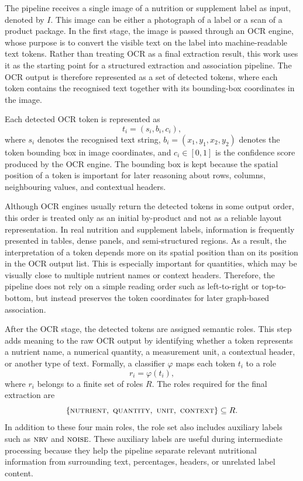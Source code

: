 The pipeline receives a single image of a nutrition or supplement label as input, denoted by \(I\). This image can be either a photograph of a label or a scan of a product package. In the first stage, the image is passed through an OCR engine, whose purpose is to convert the visible text on the label into machine-readable text tokens. Rather than treating OCR as a final extraction result, this work uses it as the starting point for a structured extraction and association pipeline. The OCR output is therefore represented as a set of detected tokens, where each token contains the recognised text together with its bounding-box coordinates in the image.

Each detected OCR token is represented as
\[
t_i = (s_i, b_i, c_i),
\]
where \(s_i\) denotes the recognised text string, \(b_i = (x_1, y_1, x_2, y_2)\) denotes the token bounding box in image coordinates, and \(c_i \in [0,1]\) is the confidence score produced by the OCR engine. The bounding box is kept because the spatial position of a token is important for later reasoning about rows, columns, neighbouring values, and contextual headers.

Although OCR engines usually return the detected tokens in some output order, this order is treated only as an initial by-product and not as a reliable layout representation. In real nutrition and supplement labels, information is frequently presented in tables, dense panels, and semi-structured regions. As a result, the interpretation of a token depends more on its spatial position than on its position in the OCR output list. This is especially important for quantities, which may be visually close to multiple nutrient names or context headers. Therefore, the pipeline does not rely on a simple reading order such as left-to-right or top-to-bottom, but instead preserves the token coordinates for later graph-based association.

After the OCR stage, the detected tokens are assigned semantic roles. This step adds meaning to the raw OCR output by identifying whether a token represents a nutrient name, a numerical quantity, a measurement unit, a contextual header, or another type of text. Formally, a classifier \(\varphi\) maps each token \(t_i\) to a role
\[
r_i = \varphi(t_i),
\]
where \(r_i\) belongs to a finite set of roles \(R\). The roles required for the final extraction are
\[
\{\textsc{nutrient},\ \textsc{quantity},\ \textsc{unit},\ \textsc{context}\} \subseteq R.
\]
In addition to these four main roles, the role set also includes auxiliary labels such as \(\textsc{nrv}\) and \(\textsc{noise}\). These auxiliary labels are useful during intermediate processing because they help the pipeline separate relevant nutritional information from surrounding text, percentages, headers, or unrelated label content.

